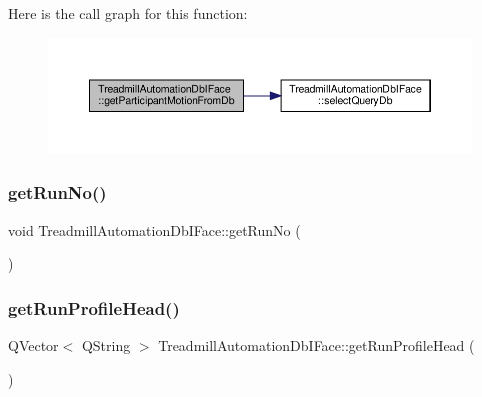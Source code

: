 Here is the call graph for this function\+:
\nopagebreak
\begin{figure}[H]
\begin{center}
\leavevmode
\includegraphics[width=350pt]{class_treadmill_automation_db_i_face_a80f861f6d15119a7b6ead07817393f6e_cgraph}
\end{center}
\end{figure}
\mbox{\label{class_treadmill_automation_db_i_face_a62dc0aa5094a1fe4a638f63870db952d}} 
\subsubsection{\texorpdfstring{get\+Run\+No()}{getRunNo()}}
{\footnotesize\ttfamily void Treadmill\+Automation\+Db\+I\+Face\+::get\+Run\+No (\begin{DoxyParamCaption}{ }\end{DoxyParamCaption})}

\mbox{\label{class_treadmill_automation_db_i_face_a6f03f5b75ee2faf2b214cb69198db552}} 
\subsubsection{\texorpdfstring{get\+Run\+Profile\+Head()}{getRunProfileHead()}}
{\footnotesize\ttfamily Q\+Vector$<$ Q\+String $>$ Treadmill\+Automation\+Db\+I\+Face\+::get\+Run\+Profile\+Head (\begin{DoxyParamCaption}{ }\end{DoxyParamCaption})}



